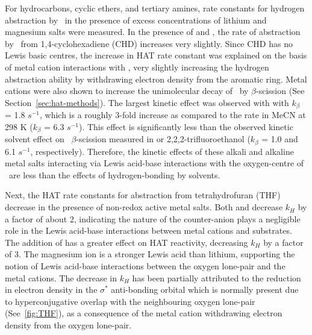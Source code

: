 \begin{doublespace}
For hydrocarbons, cyclic ethers, and tertiary amines, rate constants for
hydrogen abstraction by \cumo\ in the presence of excess concentrations of
lithium and magnesium salts were measured.\cite{Salamone2013a} In the presence
of  and , the rate of abstraction by \cumo\ from
1,4-cyclohexadiene (CHD) increases very slightly. Since CHD has no Lewis basic
centres, the increase in HAT rate constant was explained on the basis of metal
cation interactions with \cumo, very slightly increasing the hydrogen
abstraction ability by withdrawing electron density from the aromatic ring.
Metal cations were also shown to increase the unimolecular decay of \cumo\ by
$\beta$-scission (See Section~\ref{sec:hat-methods}). The largest kinetic effect
was observed with  with $k_\beta$ = 1.8 $s^{-1}$, which is a
roughly 3-fold increase as compared to the rate in MeCN at 298 K ($k_\beta$ =
6.3 $s^{-1}$).\cite{Avila1995} This effect is significantly less than the
observed kinetic solvent effect on \cumo\ $\beta$-scission measured in 
or 2,2,2-trifluoroethanol ($k_\beta$ = 1.0 and 6.1 $s^{-1}$,
respectively).\cite{Bietti2005, Neta1984} Therefore, the kinetic effects of
these alkali and alkaline metal salts interacting via Lewis acid-base
interactions with the oxygen-centre of \cumo\ are less than the effects of
hydrogen-bonding by solvents.

Next, the HAT rate constants for abstraction from tetrahydrofuran (THF) decrease
in the presence of non-redox active metal salts. Both  and 
decrease $k_H$ by a factor of about 2, indicating the nature of the
counter-anion plays a negligible role in the Lewis acid-base interactions
between metal cations and substrates. The addition of  has a
greater effect on HAT reactivity, decreasing $k_H$ by a factor of 3. The
magnesium ion is a stronger Lewis acid than lithium,\cite{Fukuzumi2002}
supporting the notion of Lewis acid-base interactions between the oxygen
lone-pair and the metal cations. The decrease in $k_H$ has been partially
attributed to the reduction in electron density in the  $\sigma^*$
anti-bonding orbital which is normally present due to hyperconjugative overlap
with the neighbouring oxygen lone-pair (See~\ref{fig:THF}), as a consequence of
the metal cation withdrawing electron density from the oxygen lone-pair.


\end{doublespace}
